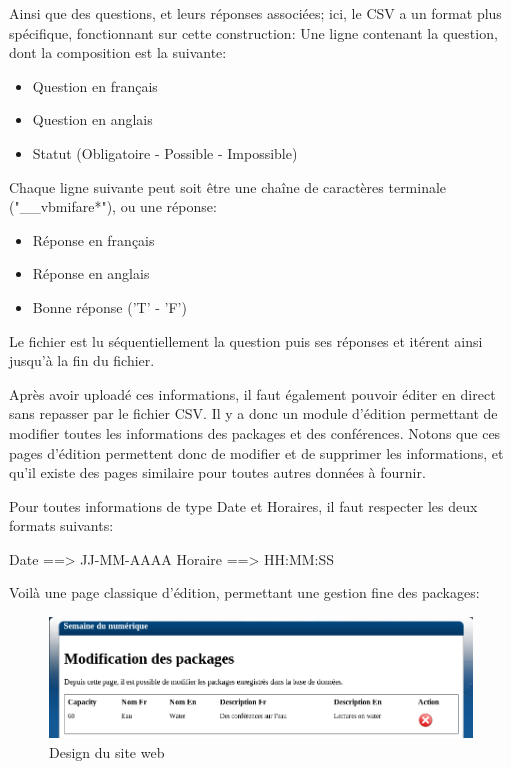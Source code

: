 Ainsi que des questions, et leurs réponses associées; ici, le CSV a un format plus spécifique, fonctionnant sur cette construction:
Une ligne contenant la question, dont la composition est la suivante:

    \begin{itemize}
    \item Question en français
    \item Question en anglais
    \item Statut (Obligatoire - Possible - Impossible)
    \end{itemize}

Chaque ligne suivante peut soit être une chaîne de caractères terminale ("\_\_vbmifare*"), ou une réponse:

    \begin{itemize}
    \item Réponse en français
    \item Réponse en anglais
    \item Bonne réponse ('T' - 'F')
    \end{itemize}

Le fichier est lu séquentiellement la question puis ses réponses et itérent ainsi jusqu'à la fin du fichier.

Après avoir uploadé ces informations, il faut également pouvoir éditer en direct sans repasser par le fichier CSV.
Il y a donc un module d'édition permettant de modifier toutes les informations des packages et des conférences.
Notons que ces pages d'édition permettent donc de modifier et de supprimer les informations, et qu'il existe des pages
similaire pour toutes autres données à fournir.

Pour toutes informations de type Date et Horaires, il faut respecter les deux formats suivants:

Date ==> JJ-MM-AAAA
Horaire ==> HH:MM:SS

Voilà une page classique d'édition, permettant une gestion fine des packages:

    \begin{figure}[h]
        \begin{center}
        \includegraphics[scale=0.4]{images/screenshotPackages.png} 
        \end{center}
        \caption{Design du site web}
        \label{Design du site web}
    \end{figure}

